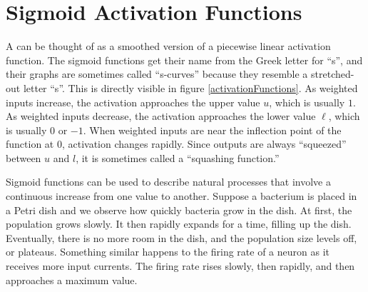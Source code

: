 \section{Sigmoid Activation Functions}


A  can be thought of as a smoothed version of a piecewise linear activation function. The sigmoid functions get their name from the Greek letter for ``s'', and their graphs are sometimes called ``s-curves'' because they resemble a stretched-out letter ``s''. This is directly visible in figure \ref{activationFunctions}. As weighted inputs increase, the activation approaches the upper value $u$, which is usually $1$. As weighted inputs decrease, the activation approaches the lower value $\ell$, which is usually $0$ or $-1$. When weighted inputs are near the inflection point of the function at 0, activation changes rapidly. Since outputs are always ``squeezed'' between $u$ and $l$, it is sometimes called a ``squashing function.''

  Sigmoid functions can be used to describe natural processes that involve a continuous increase from one value to another. Suppose a bacterium is placed in a Petri dish and we observe how quickly bacteria grow in the dish. At first, the population grows slowly. It then rapidly expands for a time, filling up the dish. Eventually, there is no more room in the dish, and the population size levels off, or plateaus. Something similar happens to the firing rate of a neuron as it receives more input currents. The firing rate rises slowly, then rapidly, and then approaches a maximum value.

